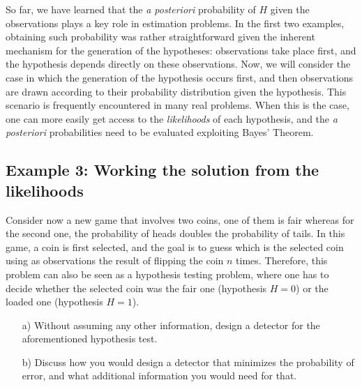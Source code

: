 So far, we have learned that the {\em a posteriori} probability of $H$ given the observations plays a key role in estimation problems. In the first two examples, obtaining such probability was rather straightforward given the inherent mechanism for the generation of the hypotheses: observations take place first, and the hypothesis depends directly on these observations. Now, we will consider the case in which the generation of the hypothesis occurs first, and then observations are drawn according to their probability distribution given the hypothesis. This scenario is frequently encountered in many real problems. When this is the case, one can more easily get access to the {\em likelihoods} of each hypothesis, and the {\em a posteriori} probabilities need to be evaluated exploiting Bayes' Theorem.

\subsection{Example 3: Working the solution from the likelihoods}
\label{subsec:example3}

\begin{problem}
	Consider now a new game that involves two coins, one of them is fair whereas for the second one, the probability of heads doubles the probability of tails. In this game, a coin is first selected, and the goal is to guess which is the selected coin using as observations the result of flipping the coin $n$ times. Therefore, this problem can also be seen as a hypothesis testing problem, where one has to decide whether the selected coin was the fair one (hypothesis $H=0$) or the loaded one (hypothesis $H=1$).
	
	\begin{itemize}
		\item [a)] Without assuming any other information, design a detector for the aforementioned hypothesis test.
		\item [b)] Discuss how you would design a detector that minimizes the probability of error, and what additional information you would need for that.
	\end{itemize}
\end{problem}

